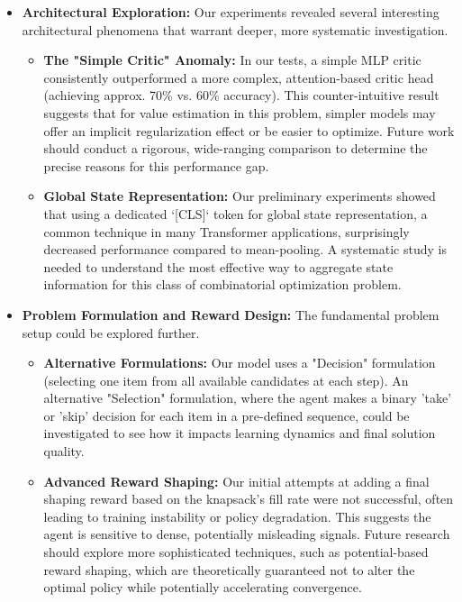 \begin{itemize}
    \item \textbf{Architectural Exploration:} Our experiments revealed several interesting architectural phenomena that warrant deeper, more systematic investigation.
    \begin{itemize}
        \item \textbf{The "Simple Critic" Anomaly:} In our tests, a simple MLP critic consistently outperformed a more complex, attention-based critic head (achieving approx. 70\% vs. 60\% accuracy). This counter-intuitive result suggests that for value estimation in this problem, simpler models may offer an implicit regularization effect or be easier to optimize. Future work should conduct a rigorous, wide-ranging comparison to determine the precise reasons for this performance gap.
        \item \textbf{Global State Representation:} Our preliminary experiments showed that using a dedicated `[CLS]` token for global state representation, a common technique in many Transformer applications, surprisingly decreased performance compared to mean-pooling. A systematic study is needed to understand the most effective way to aggregate state information for this class of combinatorial optimization problem.
    \end{itemize}

    \item \textbf{Problem Formulation and Reward Design:} The fundamental problem setup could be explored further.
    \begin{itemize}
        \item \textbf{Alternative Formulations:} Our model uses a "Decision" formulation (selecting one item from all available candidates at each step). An alternative "Selection" formulation, where the agent makes a binary 'take' or 'skip' decision for each item in a pre-defined sequence, could be investigated to see how it impacts learning dynamics and final solution quality.
        \item \textbf{Advanced Reward Shaping:} Our initial attempts at adding a final shaping reward based on the knapsack's fill rate were not successful, often leading to training instability or policy degradation. This suggests the agent is sensitive to dense, potentially misleading signals. Future research should explore more sophisticated techniques, such as potential-based reward shaping, which are theoretically guaranteed not to alter the optimal policy while potentially accelerating convergence.
    \end{itemize}


\end{itemize}
